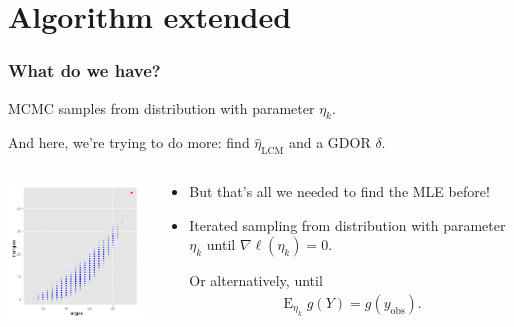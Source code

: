 \documentclass[slidestop,compress, 10pt]{beamer}
\DeclareMathOperator{\E}{E}
\newcommand{\etaLCM}{\hat{\eta}_{\textrm{LCM}}}
\newcommand{\yobs}{y_{\text{obs}}}
\begin{document}
\section{Algorithm extended}
\frame
{
\frametitle{What do we have?}
MCMC samples from distribution with parameter $\eta_k$.  

And here, we're trying to do more: find $\etaLCM$ and 
a GDOR $\delta$.
\vspace{1ex}

\begin{columns}[t]
\begin{column}[T]{0.4\textwidth}
\includegraphics[width=2in]{MCsample-bare}
\end{column}

\begin{column}[r]{0.6\textwidth}
\begin{itemize}
\item But that's all we needed to find the MLE before! 


\item Iterated sampling from distribution with parameter $\eta_k$ until $\nabla \ell(\eta_k) = 0$.

Or alternatively, until
\begin{align*}
	\E_{\eta_k} g(Y) = g(\yobs).
\end{align*}

\end{itemize}
\end{column}
\end{columns}
}
\end{document}
